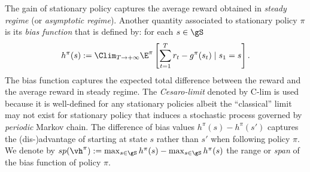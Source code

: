 The gain of stationary policy captures the average reward obtained in \emph{steady regime} (or \emph{asymptotic regime}).
Another quantity associated to stationary policy $\pi$ is its \emph{bias function} that is defined by: for each $s\in\gS$
\begin{equation}
    \label{eq:bias_defn}
    h^\pi(s) :=\Clim_{T\to+\infty} \E^\pi\left[ \sum_{t=1}^{T} r_t -g^\pi(s_t) \mid s_1=s\right].
\end{equation}
The bias function captures the expected total difference between the reward and the average reward in steady regime. 
The \emph{Cesaro-limit} denoted by $\mathrm{C}$-$\mathrm{lim}$ is used because it is well-defined for any stationary policies albeit the ``classical'' limit may not exist for stationary policy that induces a stochastic process governed by \emph{periodic} Markov chain.
The difference of bias values $h^\pi(s)-h^\pi(s')$ captures the (dis-)advantage of starting at state $s$ rather than $s'$ when following policy $\pi$.
We denote by $sp(\vh^\pi):=\max_{s\in\gS}h^\pi(s) -\max_{s\in\gS}h^\pi(s)$ the range or \emph{span} of the bias function of policy $\pi$.


